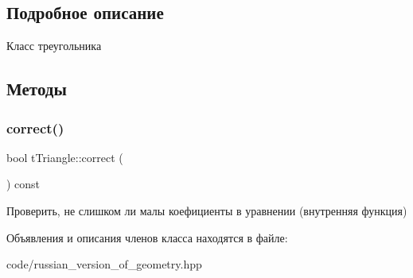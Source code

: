 \subsection{Подробное описание}
Класс треугольника 

\subsection{Методы}
\mbox{\label{classtTriangle_a21ecf9d970912497eca5009d6965aa54}} 
\subsubsection{\texorpdfstring{correct()}{correct()}}
{\footnotesize\ttfamily bool t\+Triangle\+::correct (\begin{DoxyParamCaption}{ }\end{DoxyParamCaption}) const}

Проверить, не слишком ли малы коефициенты в уравнении (внутренняя функция) 

Объявления и описания членов класса находятся в файле\+:\begin{DoxyCompactItemize}
\item 
code/russian\+\_\+version\+\_\+of\+\_\+geometry.\+hpp\end{DoxyCompactItemize}
